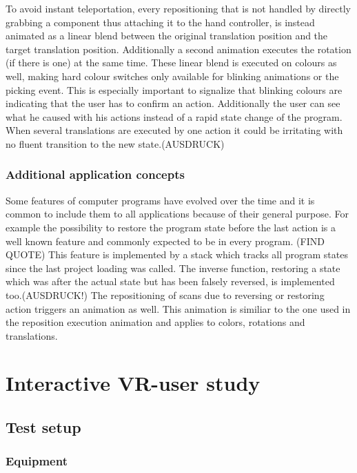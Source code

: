 \documentclass[hyperref,english,bachelorofscience,bibnum]{cgvpub}
\begin{document}
To avoid instant teleportation, every repositioning that is not handled by directly grabbing a component thus attaching it to the hand controller, is instead animated as a linear blend between the original translation position and the target translation position. Additionally a second animation executes the rotation (if there is one) at the same time.
These linear blend is executed on colours as well, making hard colour switches only available for blinking animations or the picking event. This is especially important to signalize that blinking colours are indicating that the user has to confirm an action. Additionally the user can see what he caused with his actions instead of a rapid state change of the program. When several translations are executed by one action it could be irritating with no fluent transition to the new state.(AUSDRUCK)

\subsection{Additional application concepts}

Some features of computer programs have evolved over the time and it is common to include them to all applications because of their general purpose. For example the possibility to restore the program state before the last action is a well known feature and commonly expected to be in every program. (FIND QUOTE)
This feature is implemented by a stack which tracks all program states since the last project loading was called. The inverse function, restoring a state which was after the actual state but has been falsely reversed, is implemented too.(AUSDRUCK!)
The repositioning of scans due to reversing or restoring action triggers an animation as well. This animation is similiar to the one used in the reposition execution animation and applies to colors, rotations and translations.

\chapter{Interactive VR-user study}

\section{Test setup}

\subsection{Equipment}
\end{document}
